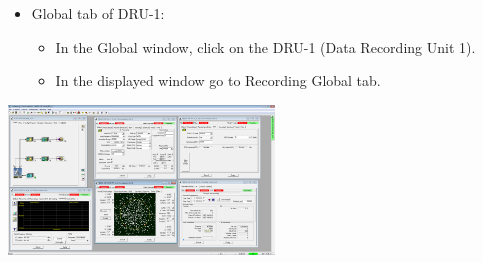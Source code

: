{{\begin{minipage}[t]{\linewidth}
\begin{itemize}[nosep,after=\strut]
\begin{itemize}
                \end{itemize}
                \item Global tab of DRU-1:
                \begin{itemize}
                    \item In the Global window, click on the DRU-1 (Data Recording Unit 1).
                    \item In the displayed window go to Recording Global tab.
                \end{itemize}
            \end{itemize}
        \end{minipage}
        \begin{center}
            \includegraphics[width=0.53\textwidth]{figuras/cortex-hdr-one-channel.png}
        \end{center}              
    }
}





